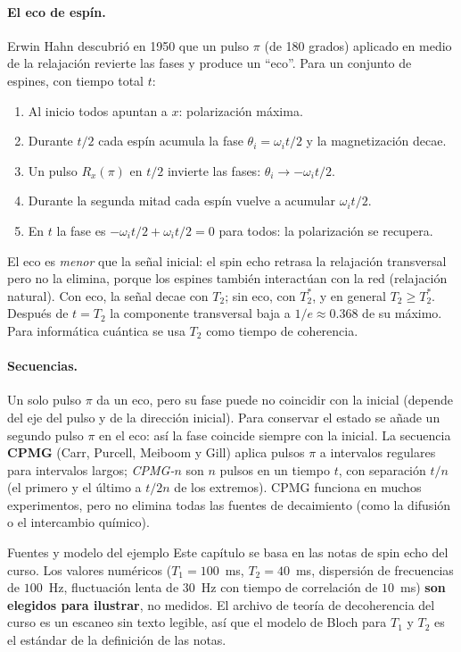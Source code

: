 \paragraph{El eco de espín.} Erwin Hahn descubrió en 1950 que un pulso $\pi$ (de 180
grados) aplicado en medio de la relajación revierte las fases y produce un
``eco''. Para un conjunto de espines, con tiempo total $t$:
\begin{enumerate}
  \item Al inicio todos apuntan a $x$: polarización máxima.
  \item Durante $t/2$ cada espín acumula la fase $\theta_i=\omega_it/2$ y la
    magnetización decae.
  \item Un pulso $R_x(\pi)$ en $t/2$ invierte las fases: $\theta_i\to-\omega_it/2$.
  \item Durante la segunda mitad cada espín vuelve a acumular $\omega_it/2$.
  \item En $t$ la fase es $-\omega_it/2+\omega_it/2=0$ para todos: la polarización
    se recupera.
\end{enumerate}
El eco es \emph{menor} que la señal inicial: el spin echo retrasa la
relajación transversal pero no la elimina, porque los espines también
interactúan con la red (relajación natural). Con eco, la señal decae con
$T_2$; sin eco, con $T_2^{*}$, y en general $T_2\ge T_2^{*}$. Después de
$t=T_2$ la componente transversal baja a $1/e\approx0.368$ de su máximo. Para
informática cuántica se usa $T_2$ como tiempo de coherencia.

\paragraph{Secuencias.} Un solo pulso $\pi$ da un eco, pero su fase puede no
coincidir con la inicial (depende del eje del pulso y de la dirección inicial).
Para conservar el estado se añade un segundo pulso $\pi$ en el eco: así la fase
coincide siempre con la inicial. La secuencia \textbf{CPMG} (Carr, Purcell,
Meiboom y Gill) aplica pulsos $\pi$ a intervalos regulares para intervalos
largos; \emph{CPMG-$n$} son $n$ pulsos en un tiempo $t$, con separación
$t/n$ (el primero y el último a $t/2n$ de los extremos). CPMG funciona en muchos
experimentos, pero no elimina todas las fuentes de decaimiento (como la
difusión o el intercambio químico).

\begin{nota}{Fuentes y modelo del ejemplo}
Este capítulo se basa en las notas de spin echo del curso. Los valores
numéricos ($T_1=100$~ms, $T_2=40$~ms, dispersión de frecuencias de $100$~Hz,
fluctuación lenta de $30$~Hz con tiempo de correlación de $10$~ms) \textbf{son
elegidos para ilustrar}, no medidos. El archivo de teoría de decoherencia del
curso es un escaneo sin texto legible, así que el modelo de Bloch para $T_1$ y
$T_2$ es el estándar de la definición de las notas.
\end{nota}

